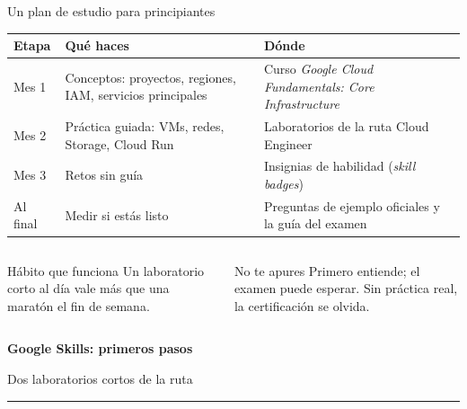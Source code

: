 \documentclass[aspectratio=169,10pt,c]{beamer}
\begin{document}
\begin{frame}{Un plan de estudio para principiantes}
\renewcommand{\arraystretch}{1.35}
\centering\small
\begin{tabular}{@{}p{2.2cm}p{5.4cm}p{5.2cm}@{}}
\toprule
\textbf{Etapa} & \textbf{Qué haces} & \textbf{Dónde}\\
\midrule
Mes 1 & Conceptos: proyectos, regiones, IAM, servicios principales & Curso \emph{Google Cloud Fundamentals: Core Infrastructure}\\
Mes 2 & Práctica guiada: VMs, redes, Storage, Cloud Run & Laboratorios de la ruta Cloud Engineer\\
Mes 3 & Retos sin guía & Insignias de habilidad (\emph{skill badges})\\
Al final & Medir si estás listo & Preguntas de ejemplo oficiales y la guía del examen\\
\bottomrule
\end{tabular}
\par\vspace{4mm}
\begin{columns}[T,onlytextwidth]
\begin{exampleblock}{Hábito que funciona}
\small Un laboratorio corto al día vale más que una maratón el fin de semana.
\end{exampleblock}
\begin{alertblock}{No te apures}
\small Primero entiende; el examen puede esperar. Sin práctica real, la certificación se olvida.
\end{alertblock}
\end{columns}
\end{frame}

\begin{frame}[plain]
\vfill
\begin{center}
{\fontsize{29}{34}\selectfont\bfseries Google Skills: primeros pasos}\par
\vspace{2mm}
{\small Dos laboratorios cortos de la ruta}\par
\vspace{4mm}
{\color{utpRojo}\rule{8.5cm}{1.2pt}}
\end{center}
\vfill
\end{frame}
\end{document}
